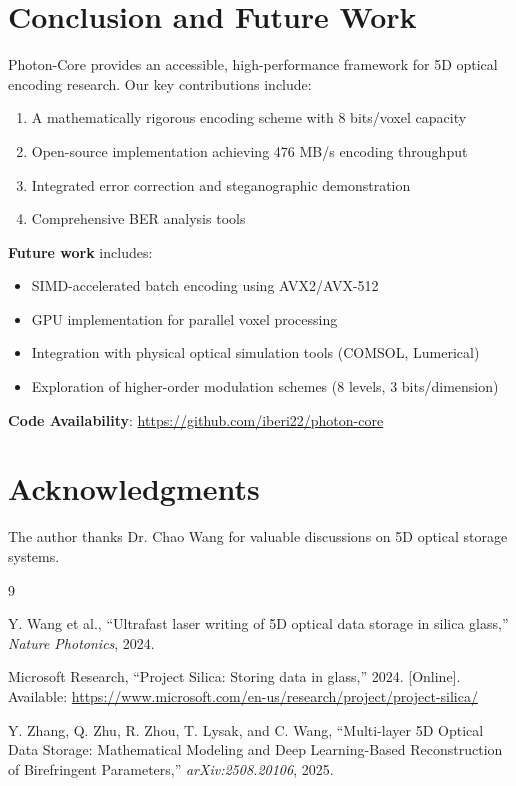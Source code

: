 \documentclass[11pt,a4paper]{article}
\begin{document}
\section{Conclusion and Future Work}

Photon-Core provides an accessible, high-performance framework for 5D optical encoding research. Our key contributions include:

\begin{enumerate}
    \item A mathematically rigorous encoding scheme with 8 bits/voxel capacity
    \item Open-source implementation achieving 476 MB/s encoding throughput
    \item Integrated error correction and steganographic demonstration
    \item Comprehensive BER analysis tools
\end{enumerate}

\textbf{Future work} includes:
\begin{itemize}
    \item SIMD-accelerated batch encoding using AVX2/AVX-512
    \item GPU implementation for parallel voxel processing
    \item Integration with physical optical simulation tools (COMSOL, Lumerical)
    \item Exploration of higher-order modulation schemes (8 levels, 3 bits/dimension)
\end{itemize}

\textbf{Code Availability}: \url{https://github.com/iberi22/photon-core}

\section*{Acknowledgments}

The author thanks Dr. Chao Wang for valuable discussions on 5D optical storage systems.


\begin{thebibliography}{9}

Y. Wang et al., ``Ultrafast laser writing of 5D optical data storage in silica glass,'' \textit{Nature Photonics}, 2024.

Microsoft Research, ``Project Silica: Storing data in glass,'' 2024. [Online]. Available: \url{https://www.microsoft.com/en-us/research/project/project-silica/}

Y. Zhang, Q. Zhu, R. Zhou, T. Lysak, and C. Wang, ``Multi-layer 5D Optical Data Storage: Mathematical Modeling and Deep Learning-Based Reconstruction of Birefringent Parameters,'' \textit{arXiv:2508.20106}, 2025.

\end{thebibliography}
\end{document}
